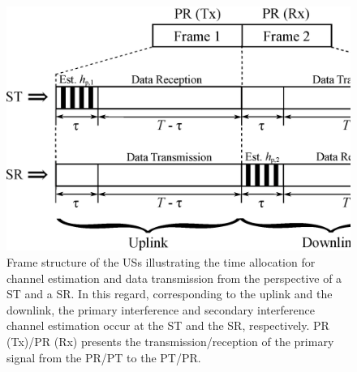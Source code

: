 \begin{figure}[!ht]
\centering
\includegraphics[width = \columnwidth]{figures/Frame_Structure}
\caption{Frame structure of the USs illustrating the time allocation for channel estimation and data transmission from the perspective of a ST and a SR. In this regard, corresponding to the uplink and the downlink, the primary interference and secondary interference channel estimation occur at the ST and the SR, respectively. PR (Tx)/PR (Rx) presents the transmission/reception of the primary signal from the PR/PT to the PT/PR.} 
\label{fig:fs}
\end{figure}



